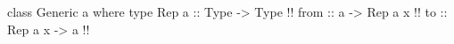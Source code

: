 \begin{code}
class Generic a where
  type Rep a :: Type -> Type  !!
  from :: a -> Rep a x  !!
  to   :: Rep a x -> a  !!
\end{code}
